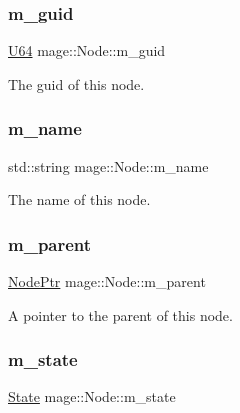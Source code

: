 \subsubsection{\texorpdfstring{m\+\_\+guid}{m\_guid}}
{\footnotesize\ttfamily \mbox{\hyperlink{namespacemage_ae0ad2dd0035dba92ed0f2e84c182b03b}{U64}} mage\+::\+Node\+::m\+\_\+guid\hspace{0.3cm}{\ttfamily [private]}}

The guid of this node. \mbox{\label{classmage_1_1_node_a69cfc52bdc0572dfc776e2ff27c9eec2}} 
\subsubsection{\texorpdfstring{m\+\_\+name}{m\_name}}
{\footnotesize\ttfamily std\+::string mage\+::\+Node\+::m\+\_\+name\hspace{0.3cm}{\ttfamily [private]}}

The name of this node. \mbox{\label{classmage_1_1_node_aa04f166b52fca444c8756c0864a16cde}} 
\subsubsection{\texorpdfstring{m\+\_\+parent}{m\_parent}}
{\footnotesize\ttfamily \mbox{\hyperlink{classmage_1_1_node_ac575dc006e0ae1134277ade977dc06b6}{Node\+Ptr}} mage\+::\+Node\+::m\+\_\+parent\hspace{0.3cm}{\ttfamily [private]}}

A pointer to the parent of this node. \mbox{\label{classmage_1_1_node_a76b775e32bb001c54a9927461eaf7926}} 
\subsubsection{\texorpdfstring{m\+\_\+state}{m\_state}}
{\footnotesize\ttfamily \mbox{\hyperlink{namespacemage_ae47d13d8477ee94893b9a3947d28eebc}{State}} mage\+::\+Node\+::m\+\_\+state\hspace{0.3cm}{\ttfamily [private]}}

